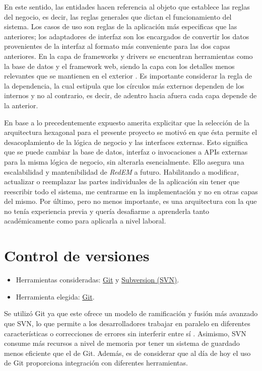 En este sentido, las entidades hacen referencia al objeto que establece las reglas del negocio, es decir, las reglas generales que dictan el funcionamiento del sistema. Los casos de uso son reglas de la aplicación más especificas que las anteriores; los adaptadores de interfaz son los encargados de convertir los datos provenientes de la interfaz al formato más conveniente para las dos capas anteriores. En la capa de frameworks y drivers se encuentran herramientas como la base de datos y el framework web, siendo la capa con los detalles menos relevantes que se mantienen en el exterior \cite{book:arquitectura_limpia}. Es importante considerar la regla de la dependencia, la cual estipula que los círculos más externos dependen de los internos y no al contrario, es decir, de adentro hacia afuera cada capa depende de la anterior.

En base a lo precedentemente expuesto amerita explicitar que la selección de la arquitectura hexagonal para el presente proyecto se motivó en que ésta permite el desacoplamiento de la lógica de negocio y las interfaces externas. Esto significa que se puede cambiar la base de datos, interfaz o invocaciones a APIs externas para la misma lógica de negocio, sin alterarla esencialmente. Ello asegura una escalabilidad y mantenibilidad de 
\emph{RedEM} a futuro. Habilitando a modificar, actualizar o reemplazar las partes individuales de la aplicación sin tener que reescribir todo el sistema, me centrarme en la implementación y no en otras capas del mismo. Por último, pero no menos importante, es una arquitectura con la que no tenía experiencia previa y quería desafiarme a aprenderla tanto académicamente como para aplicarla a nivel laboral.


\section{Control de versiones}
\begin{itemize}
\tightlist
\item
  Herramientas consideradas:
  \href{https://git-scm.com/}{Git} y
  \href{https://subversion.apache.org/)}{Subversion (SVN)}.
\item
  Herramienta elegida: \href{https://git-scm.com/}{Git}.
\end{itemize}
Se utilizó Git ya que este ofrece un modelo de ramificación y fusión más avanzado que SVN, lo que permite a los desarrolladores trabajar en paralelo en diferentes características o correcciones de errores sin interferir entre sí \cite{art:pro_git}. Asimismo, SVN consume más recursos a nivel de memoria por tener un sistema de guardado menos eficiente que el de Git. Además, es de considerar que al día de hoy el uso de Git proporciona integración con diferentes herramientas.

